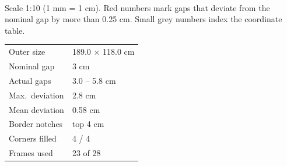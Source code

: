 \documentclass[a4paper,landscape,10pt]{article}
\begin{document}
\begin{minipage}[t]{0.74\textwidth}
\\[4pt]
{\scriptsize Scale 1:10 (1 mm = 1 cm). Red numbers mark gaps that deviate from the nominal gap by more than 0.25 cm. Small grey numbers index the coordinate table.}
\end{minipage}\hfill
\begin{minipage}[t]{0.25\textwidth}\vspace{0pt}
\small
\begin{tabular}{@{}l l@{}}
\toprule
Outer size & 189.0 $\times$ 118.0 cm \\
Nominal gap & 3 cm \\
Actual gaps & 3.0 -- 5.8 cm \\
Max.\ deviation & 2.8 cm \\
Mean deviation & 0.58 cm \\
Border notches & top 4 cm \\
Corners filled & 4 / 4 \\
Frames used & 23 of 28 \\
\bottomrule
\end{tabular}


\end{minipage}
\end{document}
